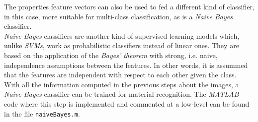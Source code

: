 The properties feature vectors can also be used to fed a different kind of classifier, in this case, more suitable for multi-class classification, as is a \emph{Naive Bayes} classifier. \\

\emph{Naive Bayes} classifiers are another kind of supervised learning models which, unlike \emph{SVMs}, work as probabilistic classifiers instead of linear ones. They are based on the application of the \emph{Bayes' theorem} with strong, i.e. naive, independence assumptions between the features. In other words, it is assummed that the features are independent with respect to each other given the class. \\ 

With all the information computed in the previous steps about the images, a \emph{Naive Bayes} classifier can be trained for material recognition. The \emph{MATLAB} code where this step is implemented and commented at a low-level can be found in the file \texttt{naiveBayes.m}.


